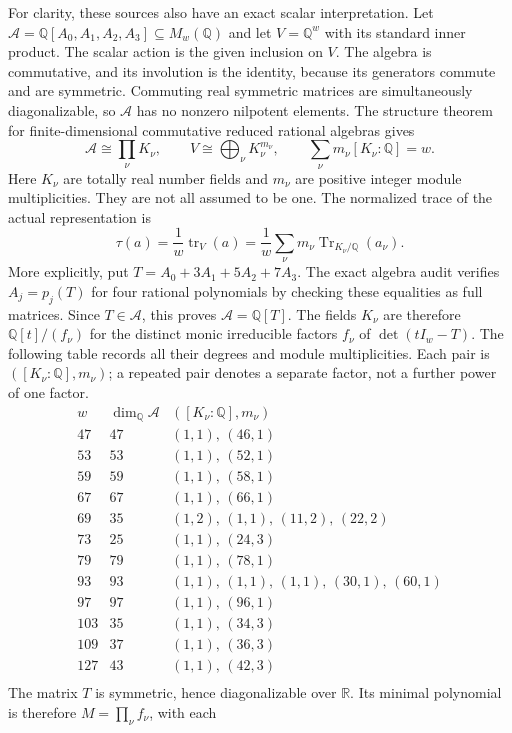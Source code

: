 \documentclass[10pt]{article}
\newcommand{\Q}{\mathbb Q}
\newcommand{\Tr}{\operatorname{Tr}}
\begin{document}
For clarity, these sources also have an exact scalar interpretation.
Let $\mathcal A=\Q[A_0,A_1,A_2,A_3]\subseteq M_w(\Q)$ and let
$V=\Q^w$ with its standard inner product. The scalar action is the given
inclusion on $V$. The algebra is commutative, and its involution is the
identity, because its generators commute and are symmetric. Commuting
real symmetric matrices are simultaneously diagonalizable, so
$\mathcal A$ has no nonzero nilpotent elements. The structure theorem
for finite-dimensional commutative reduced rational algebras gives
\[
 \mathcal A\cong\prod_\nu K_\nu,\qquad
 V\cong\bigoplus_\nu K_\nu^{m_\nu},\qquad
 \sum_\nu m_\nu[K_\nu:\Q]=w.
\]
Here $K_\nu$ are totally real number fields and $m_\nu$ are positive
integer module multiplicities. They are not all assumed to be one.
The normalized trace of the actual representation is
\[
 \tau(a)=\frac1w\operatorname{tr}_V(a)
 =\frac1w\sum_\nu m_\nu\Tr_{K_\nu/\Q}(a_\nu).
\]
More explicitly, put $T=A_0+3A_1+5A_2+7A_3$. The exact algebra audit
verifies $A_j=p_j(T)$ for four rational polynomials by checking these
equalities as full matrices. Since $T\in\mathcal A$, this proves
$\mathcal A=\Q[T]$. The fields $K_\nu$ are therefore
$\Q[t]/(f_\nu)$ for the distinct monic irreducible factors $f_\nu$ of
$\det(tI_w-T)$. The following table records all their degrees and module
multiplicities. Each pair is $([K_\nu:\Q],m_\nu)$; a repeated pair denotes
a separate factor, not a further power of one factor.
\[
\begin{array}{r|r|l}
w&\dim_\Q\mathcal A&([K_\nu:\Q],m_\nu)\\\hline
47&47&(1,1),\,(46,1)\\
53&53&(1,1),\,(52,1)\\
59&59&(1,1),\,(58,1)\\
67&67&(1,1),\,(66,1)\\
69&35&(1,2),\,(1,1),\,(11,2),\,(22,2)\\
73&25&(1,1),\,(24,3)\\
79&79&(1,1),\,(78,1)\\
93&93&(1,1),\,(1,1),\,(1,1),\,(30,1),\,(60,1)\\
97&97&(1,1),\,(96,1)\\
103&35&(1,1),\,(34,3)\\
109&37&(1,1),\,(36,3)\\
127&43&(1,1),\,(42,3)\\
\end{array}
\]
The matrix $T$ is symmetric, hence diagonalizable over $\mathbb R$.
Its minimal polynomial is therefore $M=\prod_\nu f_\nu$, with each
\end{document}
